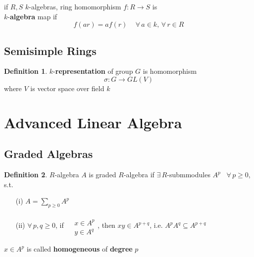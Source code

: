 \documentclass[twoside,landscape]{amsart}
\theoremstyle{plain}
\theoremstyle{definition}
\newtheorem{definition}{Definition}
\theoremstyle{remark}
\begin{document}
\begin{multicols*}{2}
if $R,S$ $k$-algebras, ring homomorphism $f:R \to S$ is \\
$k$-\textbf{algebra} map if 
\[
f(ar) = af(r) \quad \, \forall \, a \in k , \, \forall \, r \in R
\]

\subsection{Semisimple Rings}

\begin{definition}
  $k$-\textbf{representation} of group $G$ is homomorphism
\[
\sigma : G \to GL(V) 
\]
where $V$ is vector space over field $k$
\end{definition}



\section{ Advanced Linear Algebra }

\subsection{}
\subsection{}
\subsection{}
\subsection{}
\subsection{}
\subsection{Graded Algebras}

\begin{definition}
  $R$-algebra $A$ is graded $R$-algebra if $\exists \, R$-submmodules $A^p$ \, $\forall \, p \geq 0$, s.t. 
\begin{enumerate}
  \item[(i)] $A = \sum_{p\geq 0 } A^p$
\item[(ii)] $\forall \, p ,q \geq 0$, if $\begin{aligned} & \quad \\
  & x \in A^p \\
  & y \in A^q \end{aligned}$, then $xy \in A^{p+q}$, i.e. $A^p A^q \subseteq A^{p+q}$ \\
\end{enumerate}
\end{definition}
$x\in A^p$ is called \textbf{homogeneous} of \textbf{degree} $p$


\end{multicols*}
\end{document}
